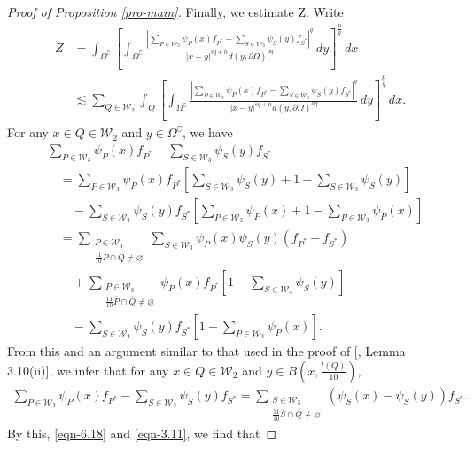 \documentclass[11pt,twoside]{article}
\def\cw{\mathcal W}
\def\sxing{S^{*}}
\def\pxing{P^{*}}
\def\boz{{\Omega}}
\def\pa{\partial}                %
\theoremstyle{mylem}
\theoremstyle{definition}
\numberwithin{equation}{section}
\begin{document}
\begin{proof}[Proof of Proposition \ref{pro-main}]
Finally, we estimate Z. Write
\begin{align}\label{eqn-6.18}
Z
&= \int_{{\boz}^\complement} \left[ \int_{{\boz}^\complement} \frac{| \sum_{P\in\mathcal{W}_3} \psi_P(x) f_{P^{*}} - \sum_{S\in\mathcal{W}_3} \psi_S(y) f_{S^{*}}|^q}{|x - y|^{s q + n}d(y,\pa\boz)^{aq}}\,dy \right]^{\frac{p}{q}}\,dx \nonumber\\
& \lesssim \sum_{Q\in\cw_2} \int_{Q} \left[ \int_{{\boz}^\complement} \frac{| \sum_{P\in\mathcal{W}_3} \psi_P(x) f_{P^{*}} - \sum_{S\in\mathcal{W}_3} \psi_S(y) f_{S^{*}}|^q}{|x - y|^{s q + n}d(y,\pa\boz)^{aq}}\,dy \right]^{\frac{p}{q}}\,dx.
\end{align}
For any $ x \in Q\in \cw_2$ and $y\in{\boz}^\complement$, we have
\begin{align}\label{eqn-3.11}
&\sum_{P\in\mathcal{W}_3} \psi_P(x) f_{P^{*}} - \sum_{S\in\mathcal{W}_3} \psi_S(y) f_{S^{*}} \nonumber \\
&\quad=\sum_{P\in\mathcal{W}_3} \psi_P(x) f_{P^{*}} \left[\sum_{S\in\mathcal{W}_3} \psi_S(y)+1-\sum_{S\in\mathcal{W}_3} \psi_S(y)\right] \nonumber \\
&\qquad- \sum_{S\in\mathcal{W}_3} \psi_S(y) f_{S^{*}} \left[\sum_{P\in\mathcal{W}_3} \psi_P(x)+1-\sum_{P\in\mathcal{W}_3} \psi_P(x)\right] \nonumber \\
&\quad=\sum_{\substack{P\in\mathcal{W}_3\\ \frac{11}{10}\overline{P}\cap\overline{Q} \neq\varnothing}} \sum_{S\in\mathcal{W}_3} \psi_P(x) \psi_S(y)(f_{\pxing}-f_{\sxing})\nonumber \\
&\qquad+ \sum_{\substack{P\in\mathcal{W}_3\\ \frac{11}{10}\overline{P}\cap\overline{Q} \neq\varnothing}}  \psi_P(x) f_{\pxing} \left[1-\sum_{S\in\mathcal{W}_3} \psi_S(y)\right] \nonumber \\
&\qquad-\sum_{S\in\mathcal{W}_3} \psi_S(y)f_{S^{*}}\left[1-\sum_{P\in\mathcal{W}_3} \psi_P(x)\right].
\end{align}
From this and an argument similar to that used in the proof of [\cite{cyz2025}, Lemma 3.10(ii)], we infer that for any $x \in Q\in \cw_2$ and $y\in B(x,\frac{l(Q)}{10})$,
\begin{align*}
\sum_{P\in\mathcal{W}_3} \psi_P(x) f_{P^{*}} - \sum_{S\in\mathcal{W}_3} \psi_S(y) f_{S^{*}}=\sum_{\substack{S\in\mathcal{W}_3\\ \frac{11}{10}\overline{S}\cap\overline{Q} \neq\varnothing}} (\psi_S(x)-\psi_S(y))f_{S^{*}}.
\end{align*}
By this, \eqref{eqn-6.18} and \eqref{eqn-3.11}, we find that

\end{proof}
\end{document}
